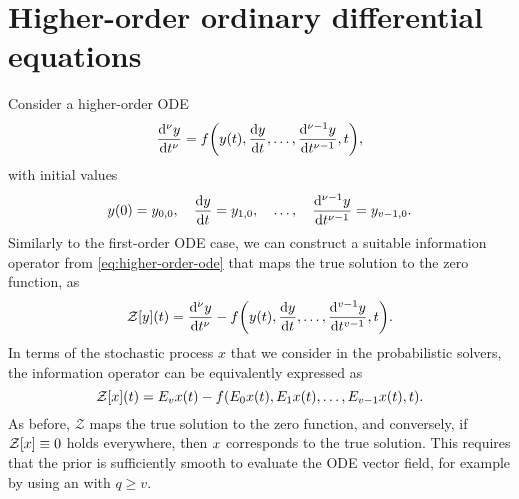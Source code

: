 \documentclass{mimosis}
\begin{document}
\section{Higher-order ordinary differential equations}
\label{sec:org5a3d678}
\label{sec:higher-order-odes}
Consider a higher-order ODE
\begin{equation}
  \label{eq:higher-order-ode}
  \dv[\nu]{\val}{t} = \vf(\val(t), \dv{\val}{t}, \dots, \dv[\nu-1]{\val}{t}, t),
\end{equation}
with initial values
\begin{equation}
  y(0) = y_{0,0}, \quad
  \dv{y}{t}(0) = y_{1,0}, \quad
  \dots, \quad
  \dv[\nu-1]{y}{t}(0) = y_{v-1,0}.
\end{equation}
Similarly to the first-order ODE case, we can construct a suitable information operator from \cref{eq:higher-order-ode} that maps the true solution to the zero function, as
\begin{equation}
  \label{eq:higher-order-infoop}
  \mathcal{Z}[\val](t) =
    \dv[\nu]{\val}{t} - \vf(\val(t), \dv{\val}{t}, \dots, \dv[v-1]{\val}{t}, t).
\end{equation}
In terms of the stochastic process \(x\) that we consider in the probabilistic solvers, the information operator can be equivalently expressed as
\begin{equation}
  \label{eq:higher-order-infoop}
  \mathcal{Z}[\st](t) =
    \proj{v} \st(t) - \vf(\proj{0} \st(t), \proj{1} \st(t), \dots, \proj{v-1} \st(t), t).
\end{equation}
As before, \(\mathcal{Z}\) maps the true solution to the zero function, and conversely, if \(\mathcal{Z}[x] \equiv 0\) holds everywhere, then \(x\) corresponds to the true solution.
This requires that the prior is sufficiently smooth to evaluate the ODE vector field, for example by using an  with \(q \geq v\).
\end{document}
